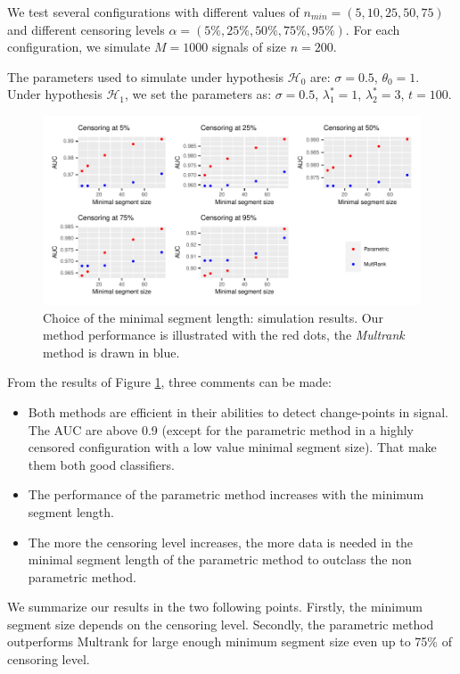 We test several configurations with different values of $n_{min} = (5,10,25,50,75)$ and different censoring levels $\alpha = (5\%,25\%,50\%,75\%,95\%)$. For each configuration, we simulate $M = 1000$ signals of size $n = 200$. 

The parameters used to simulate under hypothesis $\mathcal{H}_0$ are: $\sigma = 0.5$, $\theta_0 = 1$. Under hypothesis $\mathcal{H}_1$, we set the parameters as: $\sigma = 0.5$, $\lambda^*_1 = 1$, $\lambda^*_2 = 3$, $t = 100$. 


\begin{figure}[ht]
\centering
\includegraphics{figs/Chap4/sim_minseg.pdf}
\caption{Choice of the minimal segment length: simulation results. Our method performance is illustrated with the red dots, the \textit{Multrank} method is drawn in blue.}
\label{fig:sim_minseg}
\end{figure}

From the results of Figure \ref{fig:sim_minseg}, three comments can be made:  
\begin{itemize}
\item Both methods are efficient in their abilities to detect change-points in signal. The AUC are above 0.9 (except for the parametric method in a highly censored configuration with a low value minimal segment size). That make them both good classifiers. 
\item The performance of the parametric method increases with the minimum segment length. 
\item The more the censoring level increases, the more data is needed in the minimal segment length of the parametric method to outclass the non parametric method. 
\end{itemize}

We summarize our results in the two following points. Firstly, the minimum segment size depends on the censoring level. Secondly, the parametric method outperforms Multrank for large enough minimum segment size even up to 75\% of censoring level.

